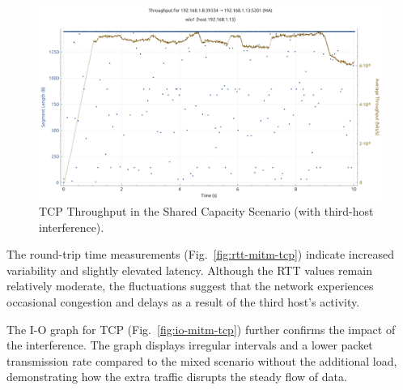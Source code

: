 \begin{enumerate}
                \begin{figure}[ht]
                    \centering
                    \includegraphics[width=0.9\columnwidth]{images/graphs/Throughput/Throughput_MIX_MITM_TCP.pdf}
                    \caption{TCP Throughput in the Shared Capacity Scenario (with third-host interference).}
                    \label{fig:throughput-mitm-tcp}
                \end{figure}

                The round-trip time measurements (Fig.~\ref{fig:rtt-mitm-tcp}) indicate increased variability and slightly elevated latency. 
                Although the RTT values remain relatively moderate, the fluctuations suggest that the network experiences occasional congestion and delays as a result of the third host's activity.


                The I-O graph for TCP (Fig.~\ref{fig:io-mitm-tcp}) further confirms the impact of the interference. 
                The graph displays irregular intervals and a lower packet transmission rate compared to the mixed scenario without the additional load, demonstrating how the extra traffic disrupts the steady flow of data.


\end{enumerate}
